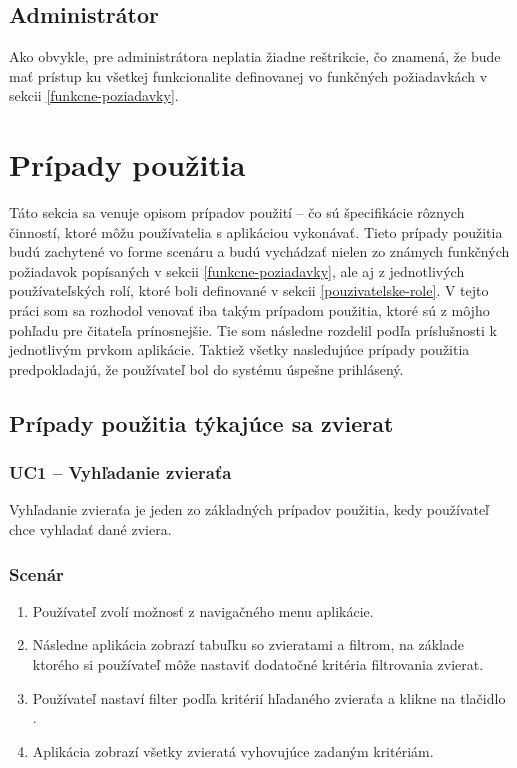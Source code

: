 \subsection{Administrátor}
Ako obvykle, pre administrátora neplatia žiadne reštrikcie, čo znamená, že bude mať prístup ku všetkej funkcionalite definovanej vo funkčných požiadavkách v sekcii \ref{funkcne-poziadavky}.

\section{Prípady použitia}
Táto sekcia sa venuje opisom prípadov použití -- čo sú špecifikácie rôznych činností, ktoré môžu používatelia s aplikáciou vykonávať.\cite{co-su-pripady-pouzitia} Tieto prípady použitia budú zachytené vo forme scenáru a budú vychádzať nielen zo známych funkčných požiadavok popísaných v sekcii \ref{funkcne-poziadavky}, ale aj z jednotlivých používateľských rolí, ktoré boli definované v sekcii \ref{pouzivatelske-role}. V tejto práci som sa rozhodol venovať iba takým prípadom použitia, ktoré sú z môjho pohľadu pre čitateľa prínosnejšie. Tie som následne rozdelil podľa príslušnosti k jednotlivým prvkom aplikácie. Taktiež všetky nasledujúce prípady použitia predpokladajú, že používateľ bol do systému úspešne prihlásený.

\subsection{Prípady použitia týkajúce sa zvierat}

\subsubsection*{UC1 -- Vyhľadanie zvieraťa}\label{uc1}

Vyhľadanie zvieraťa je jeden zo základných prípadov použitia, kedy používateľ chce vyhladať dané zviera.

\subsubsection*{Scenár}

\begin{enumerate}
	\item Používateľ zvolí možnosť  z navigačného menu aplikácie.
	\item Následne aplikácia zobrazí tabuľku so zvieratami a filtrom, na základe ktorého si používateľ môže nastaviť dodatočné kritéria filtrovania zvierat.
	\item Používateľ nastaví filter podľa kritérií hľadaného zvieraťa a klikne na tlačidlo .
	\item Aplikácia zobrazí všetky zvieratá vyhovujúce zadaným kritériám.
\end{enumerate}

